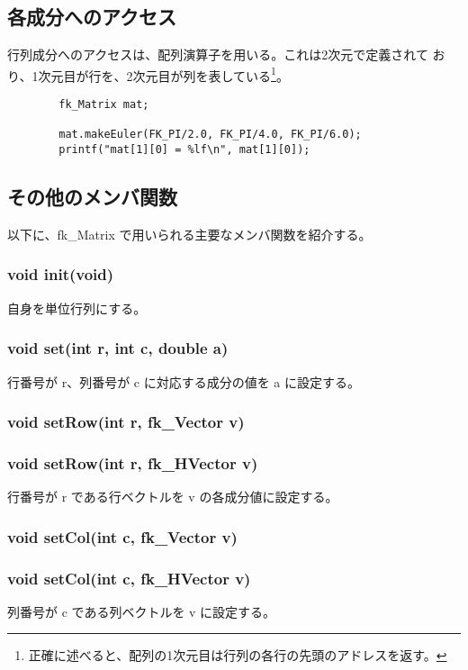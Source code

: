 \subsection{各成分へのアクセス}
行列成分へのアクセスは、配列演算子を用いる。これは2次元で定義されて
おり、1次元目が行を、2次元目が列を表している\footnote{
正確に述べると、配列の1次元目は行列の各行の先頭のアドレスを返す。}。
\\
\begin{screen}
\begin{verbatim}
        fk_Matrix mat;

        mat.makeEuler(FK_PI/2.0, FK_PI/4.0, FK_PI/6.0);
        printf("mat[1][0] = %lf\n", mat[1][0]);
\end{verbatim}
\end{screen}
\subsection{その他のメンバ関数}
以下に、fk\_Matrix で用いられる主要なメンバ関数を紹介する。

\subsubsection*{void init(void)}
自身を単位行列にする。

\subsubsection*{void set(int r, int c, double a)}
行番号が r、列番号が c に対応する成分の値を a に設定する。

\subsubsection*{void setRow(int r, fk\_Vector v)}
\subsubsection*{void setRow(int r, fk\_HVector v)}
行番号が r である行ベクトルを v の各成分値に設定する。

\subsubsection*{void setCol(int c, fk\_Vector v)}
\subsubsection*{void setCol(int c, fk\_HVector v)}
列番号が c である列ベクトルを v に設定する。

